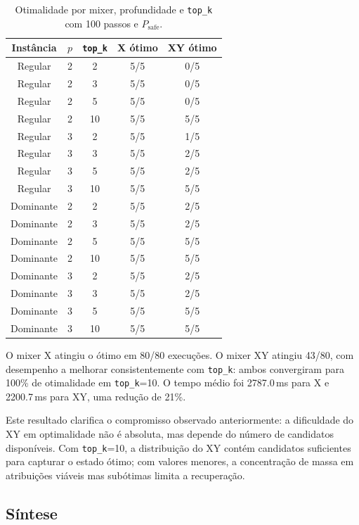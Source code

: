 \begin{table}[H]
\centering
\begin{tabular}{|c|c|c|c|c|}
\hline
\textbf{Instância} & \textbf{$p$} & \textbf{\texttt{top\_k}} & 
\textbf{X ótimo} & \textbf{XY ótimo} \\
\hline
Regular   & 2 & 2  & 5/5 & 0/5 \\
Regular   & 2 & 3  & 5/5 & 0/5 \\
Regular   & 2 & 5  & 5/5 & 0/5 \\
Regular   & 2 & 10 & 5/5 & 5/5 \\
Regular   & 3 & 2  & 5/5 & 1/5 \\
Regular   & 3 & 3  & 5/5 & 2/5 \\
Regular   & 3 & 5  & 5/5 & 2/5 \\
Regular   & 3 & 10 & 5/5 & 5/5 \\
Dominante & 2 & 2  & 5/5 & 2/5 \\
Dominante & 2 & 3  & 5/5 & 2/5 \\
Dominante & 2 & 5  & 5/5 & 5/5 \\
Dominante & 2 & 10 & 5/5 & 5/5 \\
Dominante & 3 & 2  & 5/5 & 2/5 \\
Dominante & 3 & 3  & 5/5 & 2/5 \\
Dominante & 3 & 5  & 5/5 & 5/5 \\
Dominante & 3 & 10 & 5/5 & 5/5 \\
\hline
\end{tabular}
\caption{Otimalidade por mixer, profundidade e \texttt{top\_k} com 100 passos e $P_\text{safe}$.}
\label{tab:resultados-mx5}
\end{table}

O mixer X atingiu o ótimo em 80/80 execuções. O mixer XY atingiu 43/80, com
desempenho a melhorar consistentemente com \texttt{top\_k}: ambos convergiram para
100\% de otimalidade em \texttt{top\_k}=10. O tempo médio foi 2787.0\,ms para X e
2200.7\,ms para XY, uma redução de 21\%.

Este resultado clarifica o compromisso observado anteriormente: a dificuldade do XY
em optimalidade não é absoluta, mas depende do número de candidatos disponíveis. Com
\texttt{top\_k}=10, a distribuição do XY contém candidatos suficientes para capturar
o estado ótimo; com valores menores, a concentração de massa em atribuições viáveis
mas subótimas limita a recuperação.

\subsection{Síntese}

